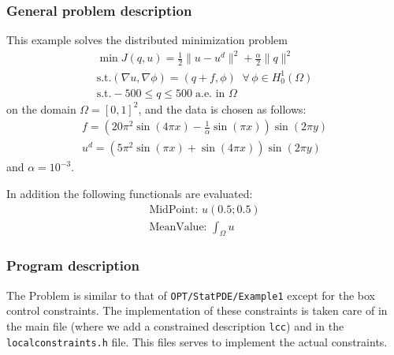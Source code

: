 \subsubsection{General problem description}
This example solves the distributed minimization problem
\begin{gather*}
\min J(q,u) = \frac{1}{2} \|u-u^d\|^2 + \frac{\alpha}{2}\|q\|^2\\
\text{s.t.} (\nabla u,\nabla \phi) = (q+f,\phi)\;\;\forall\,\phi \in H^1_0(\Omega)\\
\text{s.t.} -500 \le q \le 500\;\text{a.e. in }\Omega
\end{gather*}
on the domain $\Omega = [0,1]^2$, and the data is chosen as follows:
\begin{gather*}
 f = \left(20\pi^2  \sin(4 \pi x) - \frac{1}{\alpha}  \sin(\pi x)\right) \sin(2 \pi y)\\
 u^d = \left( 5 \pi^2 \sin(\pi x) + \sin(4 \pi x)\right)  \sin(2\pi y)
\end{gather*}
and $\alpha = 10^{-3}$.

In addition the following functionals are evaluated:
\begin{gather*}
  \text{MidPoint: } u(0.5 ; 0.5)\\[2mm]
  \text{MeanValue: }\int_\Omega u
\end{gather*}


\subsubsection{Program description}

The Problem is similar to that of {\tt OPT/StatPDE/Example1} except for the box 
control constraints.
The implementation of these constraints is taken care of in the main file
(where we add a constrained description \texttt{lcc}) and in the
\texttt{localconstraints.h} file. This files serves to implement the actual constraints.
 
